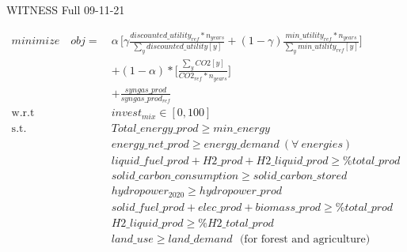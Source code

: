 \documentclass{article}
\begin{document}
WITNESS Full 09-11-21

\begin{equation}
\begin{aligned}
minimize \quad  obj =~
& \alpha\,\Bigg[\gamma \frac{discounted\_utility_{ref}*n_{years}}{\sum_{y}discounted\_utility[y]}
+ (1 - \gamma) \frac{min\_utility_{ref}*n_{years}}{\sum_{y}min\_utility_{ref}[y]} \Bigg] \\
& +(1-\alpha)*\Bigg[\frac{\sum_{y}CO2[y]}{CO2_{ref}*n_{years}} \Bigg] \\
%
%
&  + \frac{syngas\_prod}{syngas\_prod_{ref}}
\\
\textrm{w.r.t} \quad & invest_{mix} \in [0,100]\\                     
\textrm{s.t.} \quad 
  & Total\_energy\_prod \geq min\_energy \\
  & energy\_net\_prod \geq energy\_demand ~(\forall~ energies) \\
  & liquid\_fuel\_prod + H2\_prod + H2\_liquid\_prod \geq \%total\_prod \\
  & solid\_carbon\_consumption \geq solid\_carbon\_stored \\
  & hydropower_{2020} \geq hydropower\_prod \\
  & solid\_fuel\_prod + elec\_prod + biomass\_prod \geq \%total\_prod \\
  & H2\_liquid\_prod \geq \% H2\_total\_prod \\
  & land\_use \geq land\_demand \textrm{~~(for forest and agriculture)}
\end{aligned}
\end{equation}
\end{document}
